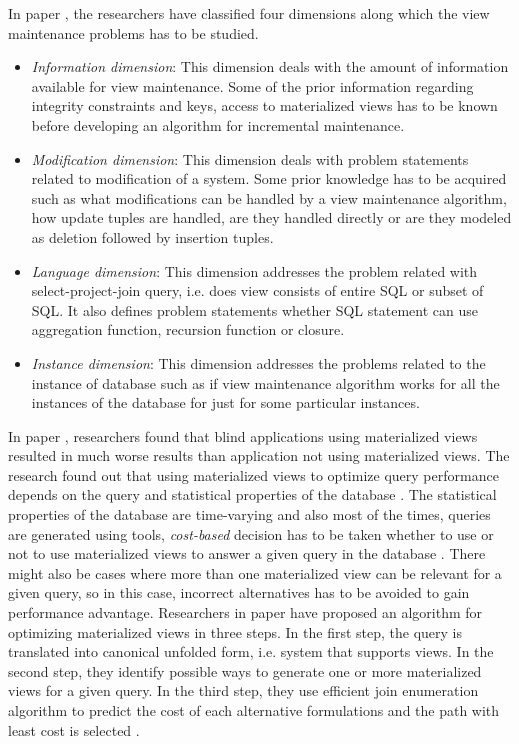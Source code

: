\documentclass[11pt,a4paper,bibtotoc,idxtotoc,headsepline,footsepline,footexclude,BCOR12mm,DIV13]{scrbook}
\begin{document}
In paper \cite{maintenance:materializedviews}, the researchers have classified four dimensions along which the view maintenance problems has to be studied. 
\begin{itemize}
	\item \emph{Information dimension}: This dimension deals with the amount of information available for view maintenance. Some of the prior information regarding integrity constraints and keys, access to materialized views has to be known before developing an algorithm for incremental maintenance.
	
	\item \emph{Modification dimension}: This dimension deals with problem statements related to modification of a system. Some prior knowledge has to be acquired such as what modifications can be handled by a view maintenance algorithm, how update tuples are handled, are they handled directly or are they modeled as deletion followed by insertion tuples.
	
	\item \emph{Language dimension}: This dimension addresses the problem related with select-project-join query, i.e. does view consists of entire SQL or subset of SQL. It also defines problem statements whether SQL statement can use aggregation function, recursion function or closure. 
	
	\item \emph{Instance dimension}: This dimension addresses the problems related to the instance of database such as if view maintenance algorithm works for all the instances of the database for just for some particular instances. 

\end{itemize}

In paper \cite{maintenance:optimizingqueries}, researchers found that blind applications using materialized views resulted in much worse results than application not using materialized views. The research found out that using materialized views to optimize query performance depends on the query and statistical properties of the database \cite{maintenance:optimizingqueries}. The statistical properties of the database are time-varying and also most of the times, queries are generated using tools, \emph{cost-based} decision has to be taken whether to use or not to use materialized views to answer a given query in the database \cite{maintenance:optimizingqueries}. There might also be cases where more than one materialized view can be relevant for a given query, so in this case, incorrect alternatives has to be avoided to gain performance advantage. Researchers in paper  \cite{maintenance:optimizingqueries} have proposed an algorithm for optimizing materialized views in three steps. In the first step, the query is translated into canonical unfolded form, i.e. system that supports views. In the second step, they identify possible ways to generate one or more materialized views for a given query. In the third step, they use efficient join enumeration algorithm to predict the cost of each alternative formulations and the path with least cost is selected \cite{maintenance:optimizingqueries}.
\end{document}
